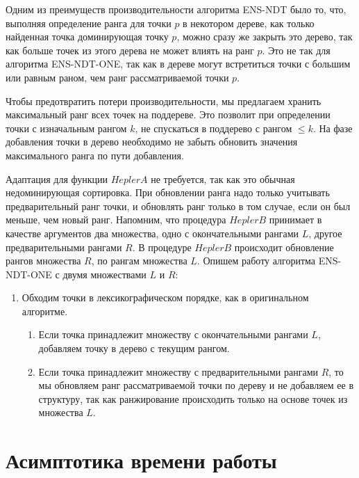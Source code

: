 Одним из преимуществ производительности алгоритма ENS-NDT было то, что, выполняя определение ранга для точки $p$ в некотором дереве, как только найденная точка доминирующая точку $p$, можно сразу же закрыть это дерево, так как больше точек из этого дерева не может влиять на ранг $p$. Это не так для алгоритма ENS-NDT-ONE, так как в дереве могут встретиться точки с большим или равным раном, чем ранг рассматриваемой точки $p$.

Чтобы предотвратить потери производительности, мы предлагаем хранить максимальный ранг всех точек на поддереве. Это позволит при определении точки с изначальным рангом $k$, не спускаться в поддерево с рангом $\leq k$. На фазе добавления точки в дерево необходимо не забыть обновить значения максимального ранга по пути добавления.

Адаптация для функции $HeplerA$ не требуется, так как это обычная недоминирующая сортировка. При обновлении ранга надо только учитывать предварительный ранг точки, и обновлять ранг только в том случае, если он был меньше, чем новый ранг. Напомним, что процедура $HeplerB$ принимает в качестве аргументов два множества, одно с окончательными рангами $L$, другое предварительными рангами $R$. В процедуре $HeplerB$ происходит обновление рангов множества $R$, по рангам множества $L$. Опишем работу алгоритма ENS-NDT-ONE с двумя множествами $L$ и $R$: 
\begin{enumerate}
  \item Обходим точки в лексикографическом порядке, как в оригинальном алгоритме.
  \begin{enumerate}
      \item Если точка принадлежит множеству с окончательными рангами $L$, добавляем точку в дерево с текущим рангом.
      \item Если точка принадлежит множеству с предварительными рангами $R$, то мы обновляем ранг рассматриваемой точки по дереву и не добавляем ее в структуру, так как ранжирование происходить только на основе точек из множества $L$.
  \end{enumerate}
\end{enumerate}

\section{Асимптотика времени работы}

